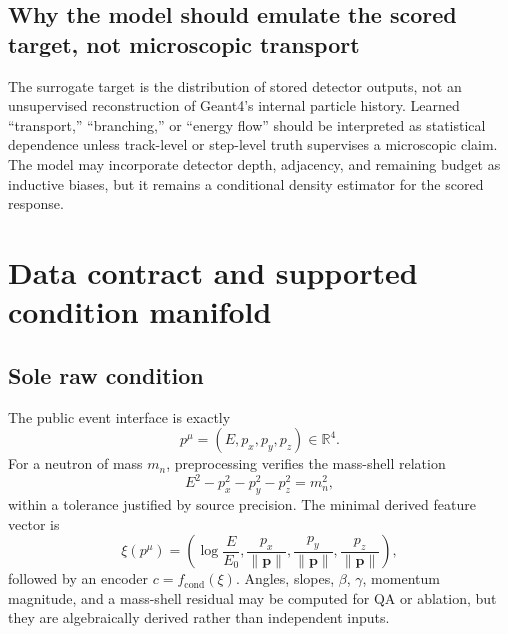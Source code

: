 \documentclass[11pt]{article}
\theoremstyle{definition}
\theoremstyle{remark}
\newcommand{\R}{\mathbb{R}}
\begin{document}
\subsection{Why the model should emulate the scored target, not microscopic transport}
The surrogate target is the distribution of stored detector outputs, not an unsupervised reconstruction of Geant4's internal particle history. Learned ``transport,'' ``branching,'' or ``energy flow'' should be interpreted as statistical dependence unless track-level or step-level truth supervises a microscopic claim. The model may incorporate detector depth, adjacency, and remaining budget as inductive biases, but it remains a conditional density estimator for the scored response.

\section{Data contract and supported condition manifold}

\subsection{Sole raw condition}
The public event interface is exactly
\begin{equation}
  p^\mu=(E,p_x,p_y,p_z)\in\R^4.
\end{equation}
For a neutron of mass $m_n$, preprocessing verifies the mass-shell relation
\begin{equation}
  E^2-p_x^2-p_y^2-p_z^2=m_n^2,
  \label{eq:mass_shell}
\end{equation}
within a tolerance justified by source precision. The minimal derived feature vector is
\begin{equation}
  \xi(p^\mu)=\left(\log\frac{E}{E_0},\frac{p_x}{\lVert\mathbf p\rVert},
  \frac{p_y}{\lVert\mathbf p\rVert},\frac{p_z}{\lVert\mathbf p\rVert}\right),
  \label{eq:min_features}
\end{equation}
followed by an encoder $c=f_{\mathrm{cond}}(\xi)$. Angles, slopes, $\beta$, $\gamma$, momentum magnitude, and a mass-shell residual may be computed for QA or ablation, but they are algebraically derived rather than independent inputs.
\end{document}
